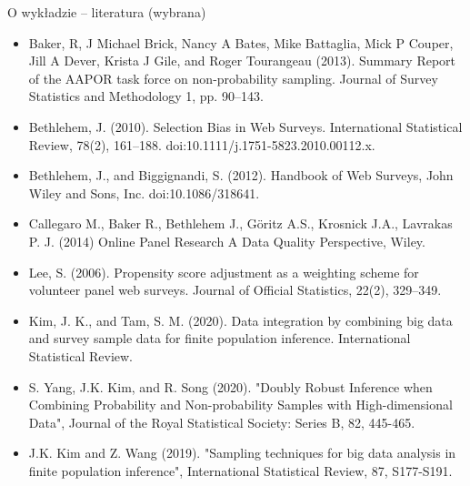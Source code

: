 \documentclass[10pt,ignorenonframetext, aspectratio=169]{beamer}
\begin{document}
\begin{frame}{O wykładzie -- literatura (wybrana)}

    \begin{itemize}
    \scriptsize
\item Baker, R, J Michael Brick, Nancy A Bates, Mike Battaglia, Mick P Couper, Jill A Dever, Krista J Gile, and Roger Tourangeau (2013). Summary Report of the AAPOR task force on non-probability sampling. Journal of Survey Statistics and Methodology 1, pp. 90–143.
\item Bethlehem, J. (2010). Selection Bias in Web Surveys. International Statistical Review, 78(2), 161–188. doi:10.1111/j.1751-5823.2010.00112.x.
\item Bethlehem, J., and Biggignandi, S. (2012). Handbook of Web Surveys, John Wiley and Sons, Inc. doi:10.1086/318641.
\item Callegaro M., Baker R., Bethlehem J., Göritz A.S., Krosnick J.A., Lavrakas P. J. (2014) Online Panel Research A Data Quality Perspective, Wiley.
\item Lee, S. (2006). Propensity score adjustment as a weighting scheme for volunteer panel web surveys. Journal of Official Statistics, 22(2), 329–349.
\item Kim, J. K., and Tam, S. M. (2020). Data integration by combining big data and survey sample data for finite population inference. International Statistical Review.
\item S. Yang, J.K. Kim, and R. Song (2020). "Doubly Robust Inference when Combining Probability and Non-probability Samples with High-dimensional Data", Journal of the Royal Statistical Society: Series B, 82, 445-465.
\item J.K. Kim and Z. Wang (2019). "Sampling techniques for big data analysis in finite population inference", International Statistical Review, 87, S177-S191.
\end{itemize}
\end{frame}
\end{document}
